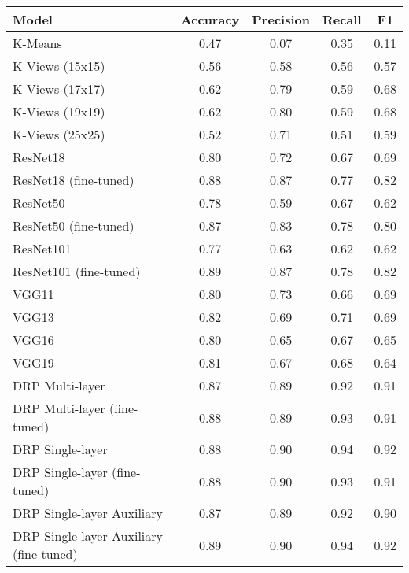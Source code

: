 \begin{tabular}{lcccc}
    \toprule
    Model                                   & Accuracy & Precision & Recall & F1   \\
    \midrule
    K-Means                                 & 0.47     & 0.07      & 0.35   & 0.11 \\
    K-Views (15x15)                         & 0.56     & 0.58      & 0.56   & 0.57 \\
    K-Views (17x17)                         & 0.62     & 0.79      & 0.59   & 0.68 \\
    K-Views (19x19)                         & 0.62     & 0.80      & 0.59   & 0.68 \\
    K-Views (25x25)                         & 0.52     & 0.71      & 0.51   & 0.59 \\
    \hline
    ResNet18                                & 0.80     & 0.72      & 0.67   & 0.69 \\
    ResNet18 (fine-tuned)                   & 0.88     & 0.87      & 0.77   & 0.82 \\
    ResNet50                                & 0.78     & 0.59      & 0.67   & 0.62 \\
    ResNet50 (fine-tuned)                   & 0.87     & 0.83      & 0.78   & 0.80 \\
    ResNet101                               & 0.77     & 0.63      & 0.62   & 0.62 \\
    ResNet101 (fine-tuned)                  & 0.89     & 0.87      & 0.78   & 0.82 \\
    \hline
    VGG11                                   & 0.80     & 0.73      & 0.66   & 0.69 \\
    VGG13                                   & 0.82     & 0.69      & 0.71   & 0.69 \\
    VGG16                                   & 0.80     & 0.65      & 0.67   & 0.65 \\
    VGG19                                   & 0.81     & 0.67      & 0.68   & 0.64 \\
    \hline
    DRP Multi-layer                         & 0.87     & 0.89      & 0.92   & 0.91 \\
    DRP Multi-layer (fine-tuned)            & 0.88     & 0.89      & 0.93   & 0.91 \\
    DRP Single-layer                        & 0.88     & 0.90      & 0.94   & 0.92 \\
    DRP Single-layer (fine-tuned)           & 0.88     & 0.90      & 0.93   & 0.91 \\
    DRP Single-layer Auxiliary              & 0.87     & 0.89      & 0.92   & 0.90 \\
    DRP Single-layer Auxiliary (fine-tuned) & 0.89     & 0.90      & 0.94   & 0.92 \\
    \bottomrule
\end{tabular}
